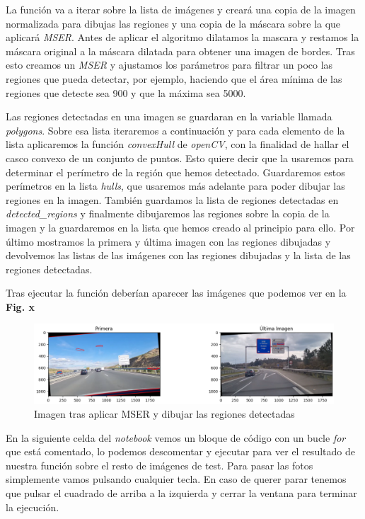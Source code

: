 \documentclass[a4paper, 12pt]{article}
\begin{document}
La función va a iterar sobre la lista de imágenes y creará una copia de la imagen normalizada para dibujas las regiones y una copia de la máscara sobre la que aplicará \textit{MSER}. Antes de aplicar el algoritmo dilatamos la mascara y restamos la máscara original a la máscara dilatada para obtener una imagen de bordes. Tras esto creamos un \textit{MSER} y ajustamos los parámetros para filtrar un poco las regiones que pueda detectar, por ejemplo, haciendo que el área mínima de las regiones que detecte sea 900 y que la máxima sea 5000. 


Las regiones detectadas en una imagen se guardaran en la variable llamada \textit{polygons}. Sobre esa lista iteraremos a continuación y para cada elemento de la lista aplicaremos la función \textit{convexHull} de \textit{openCV}, con la finalidad de hallar el casco convexo de un conjunto de puntos. Esto quiere decir que la usaremos para determinar el perímetro de la región que hemos detectado. Guardaremos estos perímetros en la lista \textit{hulls}, que usaremos más adelante para poder dibujar las regiones en la imagen. También guardamos la lista de regiones detectadas en \textit{detected\_regions} y finalmente dibujaremos las regiones sobre la copia de la imagen y la guardaremos en la lista que hemos creado al principio para ello. Por último mostramos la primera y última imagen con las regiones dibujadas y devolvemos las listas de las imágenes con las regiones dibujadas y la lista de las regiones detectadas.

Tras ejecutar la función deberían aparecer las imágenes que podemos ver en la \textbf{Fig. x}

\begin{figure}[h]
	\centering
	\includegraphics[width=0.6\linewidth]{img/ImagenesTrasMSER}
	\caption{Imagen tras aplicar MSER y dibujar las regiones detectadas}
	\label{fig:imagenesMSER}
\end{figure}


En la siguiente celda del \textit{notebook} vemos un bloque de código con un bucle \textit{for} que está comentado, lo podemos descomentar y ejecutar para ver el resultado de nuestra función sobre el resto de imágenes de test. Para pasar las fotos simplemente vamos pulsando cualquier tecla. En caso de querer parar tenemos que pulsar el cuadrado de arriba a la izquierda y cerrar la ventana para terminar la ejecución. 
\end{document}
